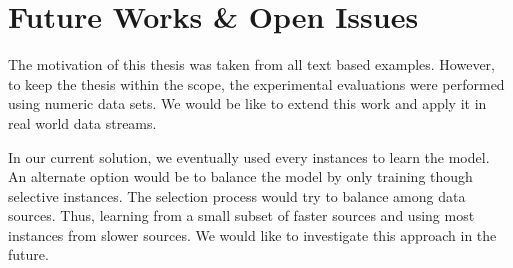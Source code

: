 \section{Future Works \& Open Issues}
The motivation of this thesis was taken from all text based examples. However, to keep the thesis within the scope, the experimental evaluations were performed using numeric data sets. We would be like to extend this work and apply it  in real world data streams. 

In our current solution, we eventually used every instances to learn the model. An alternate option would be to balance the model by only training though selective instances. The selection process would try to balance among data sources. Thus, learning from a small subset of faster sources and using most instances from slower sources. We would like to investigate this approach in the future.





